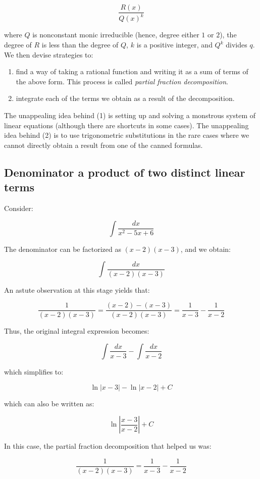 \documentclass[10pt]{amsart}
\begin{document}
$$\frac{R(x)}{Q(x)^k}$$

where $Q$ is nonconstant monic irreducible (hence, degree either $1$
or $2$), the degree of $R$ is less than the degree of $Q$, $k$ is a
positive integer, and $Q^k$ divides $q$. We then devise strategies to:

\begin{enumerate}
\item find a way of taking a rational function and writing it as a sum
  of terms of the above form. This process is called {\em partial
    fraction decomposition}.
\item integrate each of the terms we obtain as a result of the
  decomposition.
\end{enumerate}

The unappealing idea behind (1) is setting up and solving a monstrous
system of linear equations (although there are shortcuts in some
cases). The unappealing idea behind (2) is to use trigonometric
substitutions in the rare cases where we cannot directly obtain a
result from one of the canned formulas.

\subsection{Denominator a product of two distinct linear terms}

Consider:

$$\int \frac{dx}{x^2 - 5x + 6}$$

The denominator can be factorized as $(x - 2)(x - 3)$, and we obtain:

$$\int \frac{dx}{(x - 2)(x - 3)}$$

An astute observation at this stage yields that:

$$\frac{1}{(x - 2)(x - 3)} = \frac{(x - 2) - (x - 3)}{(x - 2)(x - 3)} = \frac{1}{x - 3} - \frac{1}{x - 2}$$

Thus, the original integral expression becomes:

$$\int \frac{dx}{x - 3} - \int \frac{dx}{x - 2}$$

which simplifies to:

$$\ln|x - 3| - \ln |x - 2| + C$$

which can also be written as:

$$\ln\left|\frac{x - 3}{x - 2}\right| + C$$

In this case, the partial fraction decomposition that helped us was:

$$\frac{1}{(x - 2)(x - 3)} = \frac{1}{x - 3} - \frac{1}{x - 2}$$
\end{document}
